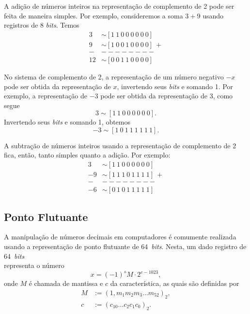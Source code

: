 A adição de números inteiros na representação de complemento de 2 pode ser feita de maneira simples. Por exemplo, consideremos a soma $3 + 9$ usando registros de 8 {\it bits}. Temos
\begin{align}
  3 &\sim [1 ~ 1 ~ 0 ~ 0 ~ 0 ~ 0 ~ 0 ~ 0]\\
  9 &\sim [1 ~ 0 ~ 0 ~ 1 ~ 0 ~ 0 ~ 0 ~ 0] ~ + \\
  - & -------- \\
 12 &\sim [0 ~ 0 ~ 1 ~ 1 ~ 0 ~ 0 ~ 0 ~ 0]
\end{align}

No sistema de complemento de 2, a representação de um número negativo $-x$ pode ser obtida da representação de $x$, invertendo seus {\it bits} e somando 1. Por exemplo, a representação de $-3$ pode ser obtida da representação de $3$, como segue
\begin{equation}
  3 \sim [1 ~ 1 ~ 0 ~ 0 ~ 0 ~ 0 ~ 0 ~ 0].
\end{equation}
Invertendo seus {\it bits} e somando 1, obtemos
\begin{equation}
  -3 \sim [1 ~ 0 ~ 1 ~ 1 ~ 1 ~ 1 ~ 1 ~ 1].
\end{equation}

A subtração de números inteiros usando a representação de complemento de 2 fica, então, tanto simples quanto a adição. Por exemplo:
\begin{align}
  3 &\sim [1 ~ 1 ~ 0 ~ 0 ~ 0 ~ 0 ~ 0 ~ 0]\\
 -9 &\sim [1 ~ 1 ~ 1 ~ 0 ~ 1 ~ 1 ~ 1 ~ 1] ~ + \\
  - & -------- \\
 -6 &\sim [0 ~ 1 ~ 0 ~ 1 ~ 1 ~ 1 ~ 1 ~ 1]
\end{align}

\subsection{Ponto Flutuante}

A manipulação de números decimais em computadores é comumente realizada usando a representação de ponto flutuante de 64~{\it bits}. Nesta, um dado registro de 64~{\it bits}
\begin{equation}
  [s ~ | ~ c_{10} ~ c_9 ~ \ldots ~ c_{0} ~ | ~ m_1 ~ m_2 ~ \ldots ~ m_{52}]
\end{equation}
representa o número
\begin{equation}
  x = (-1)^s M\cdot 2^{c - 1023},
\end{equation}
onde $M$ é chamada de mantissa e $c$ da característica, as quais são definidas por
\begin{align}
  M &:= (1,m_1m_2m_3\ldots m_{52})_2,\\
  c &:= (c_{10}\ldots c_2c_1c_0)_2.
\end{align}

